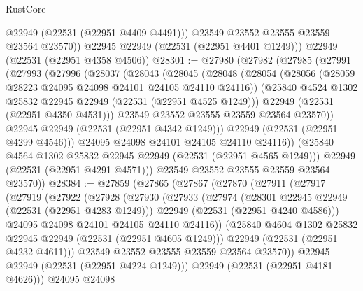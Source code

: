 \begin{lexlean}{RustCore}
\begin{coremodule}
            @22949
            (@22531 (@22951 @4409 @4491)))
          @23549
          @23552
          @23555
          @23559
          @23564
          @23570))
      @22945
      @22949
      (@22531 (@22951 @4401 @1249)))
    @22949
    (@22531 (@22951 @4358 @4506))
@28301 := @27980
    (@27982
      (@27985
        (@27991
          (@27993
            (@27996
              (@28037
                (@28043
                  (@28045
                    (@28048
                      (@28054
                        (@28056 (@28059 @28223 @24095 @24098 @24101 @24105 @24110 @24116))
                        (@25840 @4524 @1302 @25832 @22945 @22949 (@22531 (@22951 @4525 @1249)))
                        @22949
                        (@22531 (@22951 @4350 @4531)))
                      @23549
                      @23552
                      @23555
                      @23559
                      @23564
                      @23570))
                  @22945
                  @22949
                  (@22531 (@22951 @4342 @1249)))
                @22949
                (@22531 (@22951 @4299 @4546)))
              @24095
              @24098
              @24101
              @24105
              @24110
              @24116))
          (@25840 @4564 @1302 @25832 @22945 @22949 (@22531 (@22951 @4565 @1249)))
          @22949
          (@22531 (@22951 @4291 @4571)))
        @23549
        @23552
        @23555
        @23559
        @23564
        @23570))
@28384 := @27859
    (@27865
      (@27867
        (@27870
          (@27911
            (@27917
              (@27919
                (@27922
                  (@27928
                    (@27930
                      (@27933
                        (@27974
                          (@28301 @22945 @22949 (@22531 (@22951 @4283 @1249)))
                          @22949
                          (@22531 (@22951 @4240 @4586)))
                        @24095
                        @24098
                        @24101
                        @24105
                        @24110
                        @24116))
                    (@25840 @4604 @1302 @25832 @22945 @22949 (@22531 (@22951 @4605 @1249)))
                    @22949
                    (@22531 (@22951 @4232 @4611)))
                  @23549
                  @23552
                  @23555
                  @23559
                  @23564
                  @23570))
              @22945
              @22949
              (@22531 (@22951 @4224 @1249)))
            @22949
            (@22531 (@22951 @4181 @4626)))
          @24095
          @24098

\end{coremodule}
\end{lexlean}
